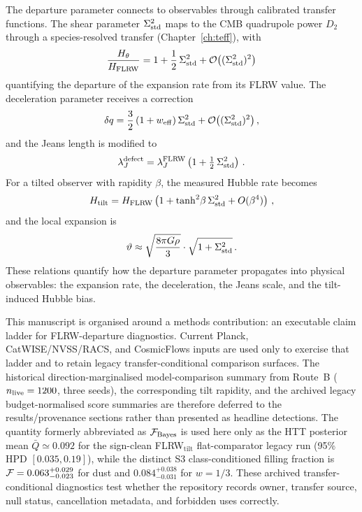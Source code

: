 The departure parameter connects to observables through
calibrated transfer functions.  The shear parameter $\Sigma^2_{\mathrm{std}}$
maps to the CMB quadrupole power $D_2$ through a
species-resolved transfer
(Chapter~\ref{ch:teff}), with
\begin{equation}\label{eq:H-ratio-defect}
\frac{H_\theta}{H_{\rm FLRW}}
= 1 + \frac{1}{2}\,\Sigma^2_{\mathrm{std}}
  + \mathcal{O}\big((\Sigma^2_{\mathrm{std}})^2\big)
\end{equation}
quantifying the departure of the expansion rate from its
FLRW value.  The deceleration parameter receives a
correction
\begin{equation}\label{eq:delta-q-exact}
\delta q
= \frac{3}{2}\,(1 + w_{\rm eff})\,\Sigma^2_{\mathrm{std}}
  + \mathcal{O}\big((\Sigma^2_{\mathrm{std}})^2\big)\,,
\end{equation}
and the Jeans length is modified to
\begin{equation}\label{eq:lambda-J-defect}
\lambda_J^{\rm defect}
= \lambda_J^{\rm FLRW}
  \left(1 + \tfrac{1}{2}\,\Sigma^2_{\mathrm{std}}\right)\,.
\end{equation}
For a tilted observer with rapidity $\beta$, the measured
Hubble rate becomes
\begin{equation}\label{eq:tilted-H-tsagas}
H_{\rm tilt}
= H_{\rm FLRW}
  \left(1 + \tanh^2\!\beta\,\Sigma^2_{\mathrm{std}}
    + O(\beta^4)\right)\,,
\end{equation}
and the local expansion is
\begin{equation}\label{eq:vartheta-estimate}
\vartheta
\approx \sqrt{\frac{8\pi G\rho}{3}}
  \cdot \sqrt{1 + \Sigma^2_{\mathrm{std}}}\,.
\end{equation}
These relations quantify how the departure parameter
propagates into physical observables: the expansion rate,
the deceleration, the Jeans scale, and the tilt-induced
Hubble bias.



This manuscript is organised around a methods contribution:
an executable claim ladder for FLRW-departure diagnostics.
Current Planck, CatWISE/NVSS/RACS, and CosmicFlows inputs are
used only to exercise that ladder and to retain legacy
transfer-conditional comparison surfaces.  The historical
direction-marginalised model-comparison summary from Route~B
($n_{\rm live} = 1200$, three seeds), the corresponding tilt
rapidity, and the archived legacy budget-normalised score summaries
are therefore deferred to the results/provenance sections rather
than presented as headline detections.  The quantity formerly abbreviated as
$\mathcal{F}_{\rm Bayes}$ is used here only as the HTT
posterior mean $\bar{Q}\simeq 0.092$ for the sign-clean
FLRW$_{\mathrm{tilt}}$ flat-comparator legacy run
(95\% HPD $[0.035,0.19]$), while the distinct S3
class-conditioned filling fraction is
$\mathcal{F}=0.063^{+0.029}_{-0.023}$ for dust and
$0.084^{+0.038}_{-0.031}$ for $w=1/3$.  These archived
transfer-conditional diagnostics test whether the repository
records owner, transfer source, null status, cancellation
metadata, and forbidden uses correctly.

